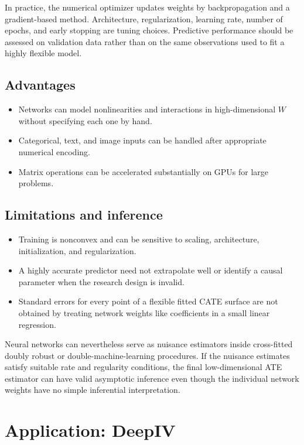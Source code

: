 In practice, the numerical optimizer updates weights by backpropagation and a
gradient-based method.  Architecture, regularization, learning rate, number of
epochs, and early stopping are tuning choices.  Predictive performance should
be assessed on validation data rather than on the same observations used to
fit a highly flexible model.

\subsection{Advantages}

\begin{itemize}
  \item Networks can model nonlinearities and interactions in high-dimensional
        $W$ without specifying each one by hand.
  \item Categorical, text, and image inputs can be handled after appropriate
        numerical encoding.
  \item Matrix operations can be accelerated substantially on GPUs for large
        problems.
\end{itemize}

\subsection{Limitations and inference}

\begin{itemize}
  \item Training is nonconvex and can be sensitive to scaling, architecture,
        initialization, and regularization.
  \item A highly accurate predictor need not extrapolate well or identify a
        causal parameter when the research design is invalid.
  \item Standard errors for every point of a flexible fitted CATE surface are
        not obtained by treating network weights like coefficients in a small
        linear regression.
\end{itemize}

Neural networks can nevertheless serve as nuisance estimators inside
cross-fitted doubly robust or double-machine-learning procedures.  If the
nuisance estimates satisfy suitable rate and regularity conditions, the final
low-dimensional ATE estimator can have valid asymptotic inference even though
the individual network weights have no simple inferential interpretation.

\section{Application: DeepIV}
\label{sec:nn-deepiv}

